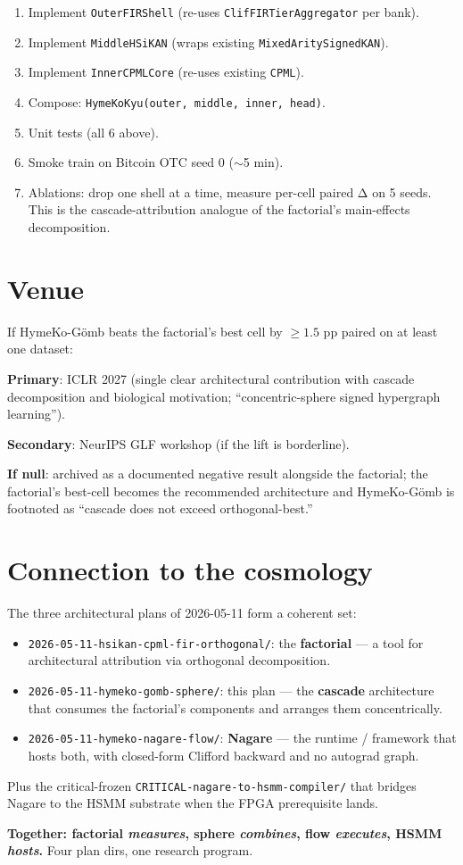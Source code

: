 \documentclass[11pt]{article}
\begin{document}
\begin{enumerate}
  \item Implement \texttt{OuterFIRShell} (re-uses
    \texttt{ClifFIRTierAggregator} per bank).
  \item Implement \texttt{MiddleHSiKAN} (wraps existing
    \texttt{MixedAritySignedKAN}).
  \item Implement \texttt{InnerCPMLCore} (re-uses existing
    \texttt{CPML}).
  \item Compose: \texttt{HymeKoKyu(outer, middle, inner, head)}.
  \item Unit tests (all 6 above).
  \item Smoke train on Bitcoin OTC seed 0 ($\sim$5 min).
  \item Ablations: drop one shell at a time, measure per-cell
    paired Δ on 5 seeds. This is the cascade-attribution
    analogue of the factorial's main-effects decomposition.
\end{enumerate}

\section{Venue}

If HymeKo-Gömb beats the factorial's best cell by $\ge 1.5$ pp paired
on at least one dataset:

\textbf{Primary}: ICLR 2027 (single clear architectural contribution
with cascade decomposition and biological motivation;
``concentric-sphere signed hypergraph learning'').

\textbf{Secondary}: NeurIPS GLF workshop (if the lift is borderline).

\textbf{If null}: archived as a documented negative result alongside
the factorial; the factorial's best-cell becomes the recommended
architecture and HymeKo-Gömb is footnoted as ``cascade does not
exceed orthogonal-best.''

\section{Connection to the cosmology}

The three architectural plans of 2026-05-11 form a coherent set:

\begin{itemize}
  \item \texttt{2026-05-11-hsikan-cpml-fir-orthogonal/}: the
    \textbf{factorial} --- a tool for architectural attribution
    via orthogonal decomposition.
  \item \texttt{2026-05-11-hymeko-gomb-sphere/}: this plan --- the
    \textbf{cascade} architecture that consumes the factorial's
    components and arranges them concentrically.
  \item \texttt{2026-05-11-hymeko-nagare-flow/}: \textbf{Nagare} ---
    the runtime / framework that hosts both, with closed-form
    Clifford backward and no autograd graph.
\end{itemize}

Plus the critical-frozen \texttt{CRITICAL-nagare-to-hsmm-compiler/}
that bridges Nagare to the HSMM substrate when the FPGA prerequisite
lands.

\textbf{Together: factorial \emph{measures}, sphere \emph{combines},
flow \emph{executes}, HSMM \emph{hosts}.} Four plan dirs, one
research program.
\end{document}
